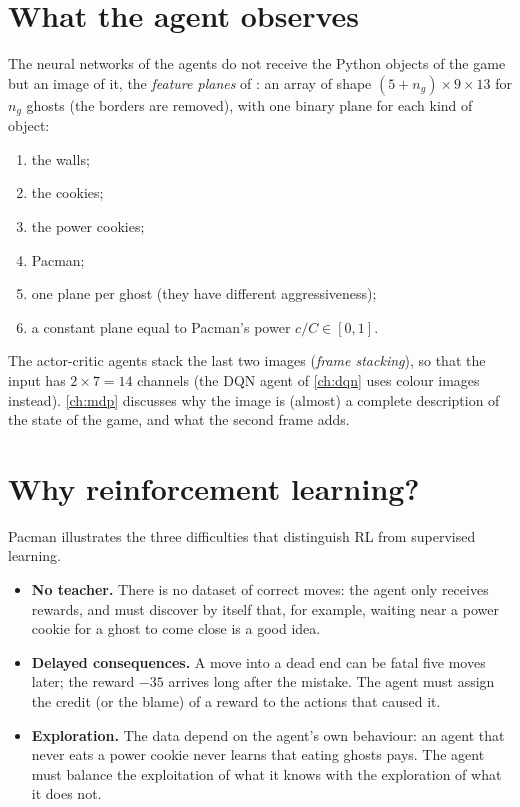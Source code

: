 \section{What the agent observes}
\label{sec:observation}

The neural networks of the agents do not receive the Python objects of the
game but an image of it, the \emph{feature planes} of
: an array of shape
$(5 + n_g) \times 9 \times 13$ for $n_g$ ghosts (the borders are removed),
with one binary plane for each kind of object:
\begin{enumerate}[nosep, label=\arabic*.]
  \item the walls;
  \item the cookies;
  \item the power cookies;
  \item Pacman;
  \item[5--6.] one plane per ghost (they have different aggressiveness);
  \item[7.] a constant plane equal to Pacman's power $c / C \in [0, 1]$.
\end{enumerate}
The actor-critic agents stack the last two images (\emph{frame stacking}),
so that the input has $2 \times 7 = 14$ channels (the DQN agent of
\cref{ch:dqn} uses colour images instead). \cref{ch:mdp} discusses why the image
is (almost) a complete description of the state of the game, and what the
second frame adds.

\section{Why reinforcement learning?}

Pacman illustrates the three difficulties that distinguish RL from
supervised learning.
\begin{itemize}
  \item \textbf{No teacher.} There is no dataset of correct moves: the
    agent only receives rewards, and must discover by itself that, for
    example, waiting near a power cookie for a ghost to come close is a
    good idea.
  \item \textbf{Delayed consequences.} A move into a dead end can be fatal
    five moves later; the reward $-35$ arrives long after the mistake. The
    agent must assign the credit (or the blame) of a reward to the actions
    that caused it.
  \item \textbf{Exploration.} The data depend on the agent's own
    behaviour: an agent that never eats a power cookie never learns that
    eating ghosts pays. The agent must balance the exploitation of what it
    knows with the exploration of what it does not.
\end{itemize}

